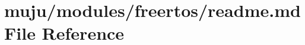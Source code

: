 \hypertarget{modules_2freertos_2_r_e_a_d_m_e_8md}{}\section{muju/modules/freertos/readme.md File Reference}
\label{modules_2freertos_2_r_e_a_d_m_e_8md}
